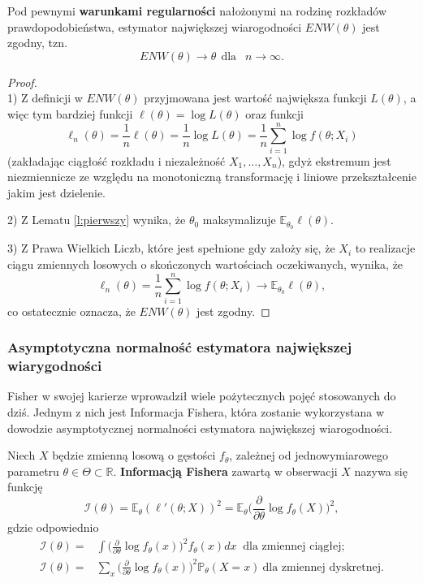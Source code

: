 \begin{theorem}
Pod pewnymi \textbf{warunkami regularności} nałożonymi na rodzinę rozkładów prawdopodobieństwa, estymator największej wiarogodności $ENW(\theta)$ jest zgodny, tzn. 
$$ENW(\theta) \rightarrow \theta \ \ \text{dla } \ \ n \rightarrow \infty.$$
\end{theorem}
\begin{proof}
\ \\
1) Z definicji w $ENW(\theta)$ przyjmowana jest wartość największa funkcji $L(\theta)$, a więc tym bardziej funkcji $ \ell(\theta) = \log L(\theta)$ oraz funkcji $$ \ell_n(\theta) = \frac{1}{n}\ell(\theta) = \frac{1}{n}\log L(\theta) = \frac{1}{n}\sum\limits_{i=1}^{n}\log f(\theta;X_i)$$ (zakładając ciągłość rozkładu i niezależność $X_1,\dots,X_n$), gdyż ekstremum jest niezmiennicze ze względu na monotoniczną transformację i liniowe przekształcenie jakim jest dzielenie.

2) Z Lematu \ref{l:pierwszy} wynika, że $\theta_0$ maksymalizuje $\mathbb{E}_{\theta_0}\ell(\theta)$.

3) Z Prawa Wielkich Liczb, które jest spełnione gdy założy się, że $X_i$ to realizacje ciągu zmiennych losowych o skończonych wartościach oczekiwanych, wynika, że $$ \ell_n(\theta) = \frac{1}{n}\sum\limits_{i=1}^{n}\log f(\theta;X_i) \rightarrow \mathbb{E}_{\theta_0}\ell(\theta),$$ co ostatecznie oznacza, że $ENW(\theta)$ jest zgodny.
\end{proof}

\newpage
\subsubsection{Asymptotyczna normalność estymatora największej wiarygodności}


Fisher w swojej karierze wprowadził wiele pożytecznych pojęć stosowanych do dziś. Jednym z nich jest Informacja Fishera, która zostanie wykorzystana w dowodzie asymptotycznej normalności estymatora największej wiarogodności.

\begin{definition}
Niech $X$ będzie zmienną losową o gęstości $f_{\theta}$, zależnej od jednowymiarowego parametru $\theta \in \Theta \subset \mathbb{R}$. \textbf{Informacją Fishera} zawartą w obserwacji $X$ nazywa się funkcję
\begin{equation}\label{wzor:fish}
\mathcal{I}(\theta) = \mathbb{E}_{\theta}(\ell'(\theta;X))^2 = \mathbb{E}_{\theta}\Big(\frac{\partial}{\partial\theta}\log f_{\theta}(X) \Big)^2,
\end{equation}
gdzie odpowiednio
\begin{align*}
\mathcal{I}(\theta) = & \int \Big(\frac{\partial}{\partial\theta}\log f_{\theta}(x) \Big)^2 f_{\theta}(x)dx \ \text{\ \ \ \ \ dla zmiennej ciągłej;} \\
\mathcal{I}(\theta) = & \sum\limits_{x}^{ } \Big(\frac{\partial}{\partial\theta}\log f_{\theta}(x) \Big)^2 \mathbb{P}_{\theta}(X=x) \ \text{dla zmiennej dyskretnej}.
\end{align*}
\end{definition}

